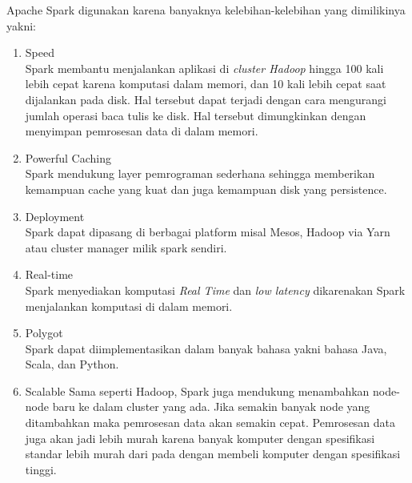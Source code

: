 Apache Spark digunakan karena banyaknya kelebihan-kelebihan yang dimilikinya yakni:
\begin{enumerate}
\item Speed\\
Spark membantu menjalankan aplikasi di \textit{cluster Hadoop} hingga 100 kali lebih cepat karena komputasi dalam memori, dan 10 kali lebih cepat saat dijalankan pada disk. Hal tersebut dapat terjadi dengan cara mengurangi jumlah operasi baca tulis ke disk. Hal tersebut dimungkinkan dengan menyimpan pemrosesan data di dalam memori.
\item Powerful Caching\\
Spark mendukung layer pemrograman sederhana sehingga memberikan kemampuan cache yang kuat dan juga kemampuan disk yang persistence. 
\item Deployment\\
Spark dapat dipasang di berbagai platform misal Mesos, Hadoop via Yarn atau cluster manager milik spark sendiri.
\item Real-time\\
Spark menyediakan komputasi \textit{Real Time} dan \textit{low latency} dikarenakan Spark menjalankan komputasi di dalam memori.
\item Polygot\\
Spark dapat diimplementasikan dalam banyak bahasa yakni bahasa Java, Scala, dan Python.
\item Scalable
Sama seperti Hadoop, Spark juga mendukung menambahkan node-node baru ke dalam cluster yang ada. Jika semakin banyak node yang ditambahkan maka pemrosesan data akan semakin cepat. Pemrosesan data juga akan jadi lebih murah karena banyak komputer dengan spesifikasi standar lebih murah dari pada dengan membeli komputer dengan spesifikasi tinggi.
\end{enumerate}

